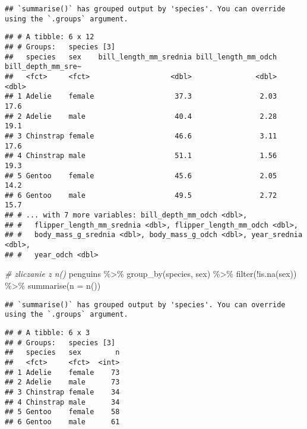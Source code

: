 \documentclass[
]{book}
\newenvironment{Shaded}{\begin{snugshade}}{\end{snugshade}}
\newcommand{\AttributeTok}[1]{\textcolor[rgb]{0.77,0.63,0.00}{#1}}
\newcommand{\CommentTok}[1]{\textcolor[rgb]{0.56,0.35,0.01}{\textit{#1}}}
\newcommand{\FunctionTok}[1]{\textcolor[rgb]{0.00,0.00,0.00}{#1}}
\newcommand{\NormalTok}[1]{#1}
\newcommand{\SpecialCharTok}[1]{\textcolor[rgb]{0.00,0.00,0.00}{#1}}
\begin{document}
\begin{verbatim}
## `summarise()` has grouped output by 'species'. You can override using the `.groups` argument.
\end{verbatim}

\begin{verbatim}
## # A tibble: 6 x 12
## # Groups:   species [3]
##   species   sex    bill_length_mm_srednia bill_length_mm_odch bill_depth_mm_sre~
##   <fct>     <fct>                   <dbl>               <dbl>              <dbl>
## 1 Adelie    female                   37.3                2.03               17.6
## 2 Adelie    male                     40.4                2.28               19.1
## 3 Chinstrap female                   46.6                3.11               17.6
## 4 Chinstrap male                     51.1                1.56               19.3
## 5 Gentoo    female                   45.6                2.05               14.2
## 6 Gentoo    male                     49.5                2.72               15.7
## # ... with 7 more variables: bill_depth_mm_odch <dbl>,
## #   flipper_length_mm_srednia <dbl>, flipper_length_mm_odch <dbl>,
## #   body_mass_g_srednia <dbl>, body_mass_g_odch <dbl>, year_srednia <dbl>,
## #   year_odch <dbl>
\end{verbatim}

\begin{Shaded}
\begin{Highlighting}[]
\CommentTok{\# zliczanie z n()}
\NormalTok{penguins }\SpecialCharTok{\%\textgreater{}\%} \FunctionTok{group\_by}\NormalTok{(species, sex) }\SpecialCharTok{\%\textgreater{}\%} \FunctionTok{filter}\NormalTok{(}\SpecialCharTok{!}\FunctionTok{is.na}\NormalTok{(sex)) }\SpecialCharTok{\%\textgreater{}\%}
  \FunctionTok{summarise}\NormalTok{(}\AttributeTok{n =} \FunctionTok{n}\NormalTok{())}
\end{Highlighting}
\end{Shaded}

\begin{verbatim}
## `summarise()` has grouped output by 'species'. You can override using the `.groups` argument.
\end{verbatim}

\begin{verbatim}
## # A tibble: 6 x 3
## # Groups:   species [3]
##   species   sex        n
##   <fct>     <fct>  <int>
## 1 Adelie    female    73
## 2 Adelie    male      73
## 3 Chinstrap female    34
## 4 Chinstrap male      34
## 5 Gentoo    female    58
## 6 Gentoo    male      61
\end{verbatim}
\end{document}
